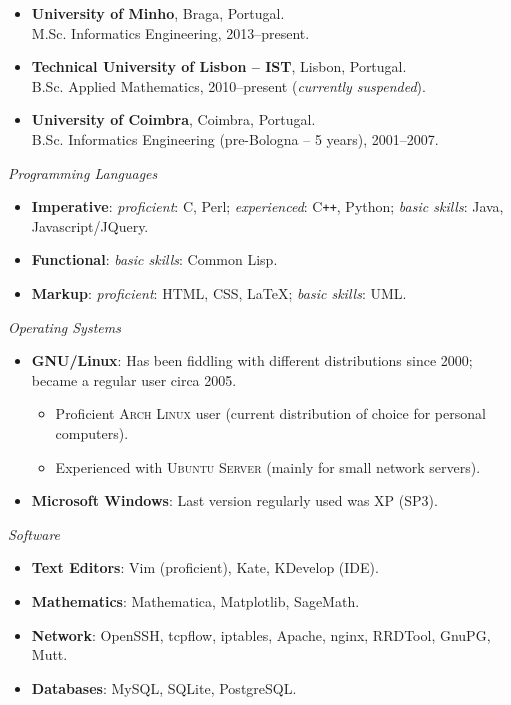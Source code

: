 \documentclass[a4paper,9pt]{extarticle}
\newenvironment{topic}[1]
   {{\noindent\large\bfseries\raisebox{0pt}[\height][1ex]{#1}\hrule}%
    \begin{list}{}{%
       \setlength{\leftmargin}{.0cm}}%
    \item[]}
   {\end{list}\medskip}
\begin{document}
\begin{topic}{Formal Education}
  \begin{itemize}[leftmargin=*]
    \item {\bfseries University of Minho}, Braga, Portugal.\\
      M.Sc. Informatics Engineering, 2013--present.
    \item {\bfseries Technical University of Lisbon -- IST}, Lisbon, Portugal.\\
      B.Sc. Applied Mathematics, 2010--present (\emph{currently suspended}).
    \item {\bfseries University of Coimbra}, Coimbra, Portugal.\\
      B.Sc. Informatics Engineering (pre-Bologna -- 5 years), 2001--2007.
  \end{itemize}
\end{topic}

\begin{topic}{Technical Skills}
  {\itshape Programming Languages}  
  \begin{itemize}[leftmargin=*]
    \item{\bfseries Imperative}: \emph{proficient}: C, Perl; \emph{experienced}: C{}\verb!++!, Python;
      \emph{basic skills}: Java, Javascript/JQuery.
    \item{\bfseries Functional}: \emph{basic skills}: Common Lisp.
    \item{\bfseries Markup}: \emph{proficient}: HTML, CSS, \LaTeX; \emph{basic skills}: UML.
  \end{itemize}
  {\itshape Operating Systems} 
  \begin{itemize}[leftmargin=*]
    \item{\bfseries GNU/Linux}: Has been fiddling with different distributions 
      since 2000; became a regular user circa 2005.
      \begin{itemize}
	\item Proficient \textsc{Arch Linux} user (current distribution of choice for personal computers).
	\item Experienced with \textsc{Ubuntu Server} (mainly for small network 
	  servers).
      \end{itemize}
    \item{\bfseries Microsoft Windows}: Last version regularly used was XP (SP3).
  \end{itemize}
  {\itshape Software}
  \begin{itemize}[leftmargin=*]
    \item{\bfseries Text Editors}: Vim (proficient), Kate, KDevelop (IDE).
    \item{\bfseries Mathematics}: Mathematica, Matplotlib, SageMath.
    \item{\bfseries Network}: OpenSSH, tcpflow, iptables, Apache, nginx, RRDTool, GnuPG, 
      Mutt.
    \item{\bfseries Databases}: MySQL, SQLite, PostgreSQL.
  \end{itemize}
\end{topic}
\end{document}
